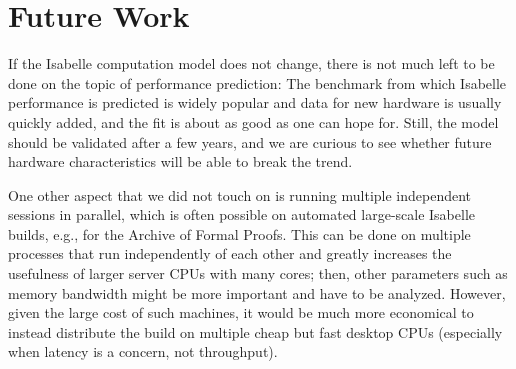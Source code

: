 \section{Future Work}\label{sec:future}

If the Isabelle computation model does not change,
there is not much left to be done on the topic of performance prediction:
The benchmark from which Isabelle performance is predicted is widely popular and data for new hardware is usually quickly added,
and the fit is about as good as one can hope for.
Still, the model should be validated after a few years,
and we are curious to see whether future hardware characteristics will be able to break the trend.

One other aspect that we did not touch on is running multiple independent sessions in parallel,
which is often possible on automated large-scale Isabelle builds, e.g., for the Archive of Formal Proofs.
This can be done on multiple processes that run independently of each other and greatly increases the usefulness of larger server CPUs with many cores;
then, other parameters such as memory bandwidth might be more important and have to be analyzed.
However, given the large cost of such machines,
it would be much more economical to instead distribute the build on multiple cheap but fast desktop CPUs
(especially when latency is a concern, not throughput).